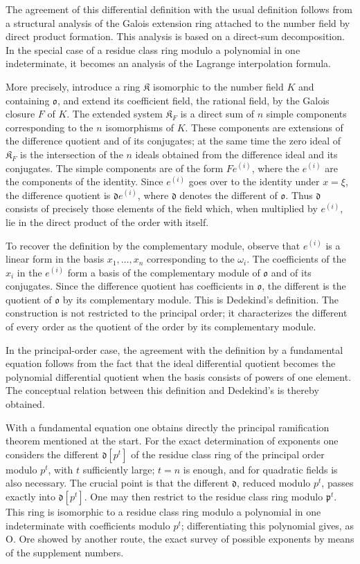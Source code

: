 \documentclass[11pt]{article}
\begin{document}
The agreement of this differential definition with the usual definition follows from a structural analysis of the Galois extension ring attached to the number field by direct product formation. This analysis is based on a direct-sum decomposition. In the special case of a residue class ring modulo a polynomial in one indeterminate, it becomes an analysis of the Lagrange interpolation formula.

More precisely, introduce a ring $\mathfrak K$ isomorphic to the number field $K$ and containing $\mathfrak o$, and extend its coefficient field, the rational field, by the Galois closure $F$ of $K$. The extended system $\mathfrak K_F$ is a direct sum of $n$ simple components corresponding to the $n$ isomorphisms of $K$. These components are extensions of the difference quotient and of its conjugates; at the same time the zero ideal of $\mathfrak K_F$ is the intersection of the $n$ ideals obtained from the difference ideal and its conjugates. The simple components are of the form $Fe^{(i)}$, where the $e^{(i)}$ are the components of the identity. Since $e^{(i)}$ goes over to the identity under $x=\xi$, the difference quotient is $\mathfrak d e^{(i)}$, where $\mathfrak d$ denotes the different of $\mathfrak o$. Thus $\mathfrak d$ consists of precisely those elements of the field which, when multiplied by $e^{(i)}$, lie in the direct product of the order with itself.

To recover the definition by the complementary module, observe that $e^{(i)}$ is a linear form in the basis $x_1,\ldots,x_n$ corresponding to the $\omega_i$. The coefficients of the $x_i$ in the $e^{(i)}$ form a basis of the complementary module of $\mathfrak o$ and of its conjugates. Since the difference quotient has coefficients in $\mathfrak o$, the different is the quotient of $\mathfrak o$ by its complementary module. This is Dedekind's definition. The construction is not restricted to the principal order; it characterizes the different of every order as the quotient of the order by its complementary module.

In the principal-order case, the agreement with the definition by a fundamental equation follows from the fact that the ideal differential quotient becomes the polynomial differential quotient when the basis consists of powers of one element. The conceptual relation between this definition and Dedekind's is thereby obtained.

With a fundamental equation one obtains directly the principal ramification theorem mentioned at the start. For the exact determination of exponents one considers the different $\mathfrak d[p^t]$ of the residue class ring of the principal order modulo $p^t$, with $t$ sufficiently large; $t=n$ is enough, and for quadratic fields is also necessary. The crucial point is that the different $\mathfrak d$, reduced modulo $p^t$, passes exactly into $\mathfrak d[p^t]$. One may then restrict to the residue class ring modulo $\mathfrak p^t$. This ring is isomorphic to a residue class ring modulo a polynomial in one indeterminate with coefficients modulo $p^t$; differentiating this polynomial gives, as O. Ore showed by another route, the exact survey of possible exponents by means of the supplement numbers.
\end{document}
